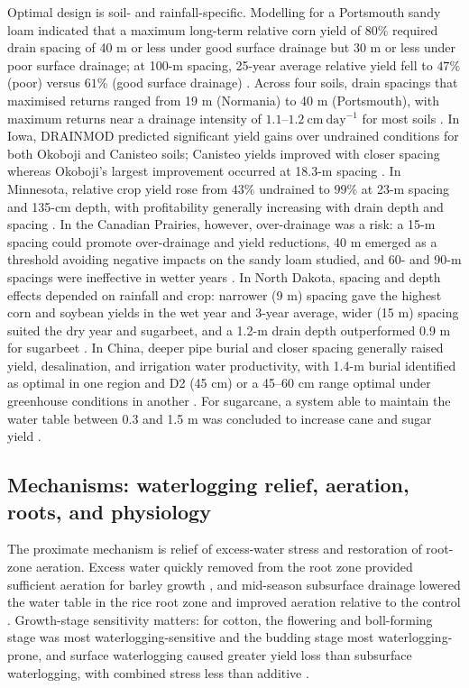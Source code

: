 \documentclass[11pt]{article}
\begin{document}
Optimal design is soil- and rainfall-specific. Modelling for a Portsmouth sandy loam indicated that a maximum long-term relative corn yield of \(80\%\) required drain spacing of 40 m or less under good surface drainage but 30 m or less under poor surface drainage; at 100-m spacing, 25-year average relative yield fell to \(47\%\) (poor) versus \(61\%\) (good surface drainage) \parencite{HARDJOAMIDJOJO1982}. Across four soils, drain spacings that maximised returns ranged from 19 m (Normania) to 40 m (Portsmouth), with maximum returns near a drainage intensity of \(1.1\textrm{--}1.2\ \mathrm{cm\ day^{-1}}\) for most soils \parencite{Skaggs2006}. In Iowa, DRAINMOD predicted significant yield gains over undrained conditions for both Okoboji and Canisteo soils; Canisteo yields improved with closer spacing whereas Okoboji's largest improvement occurred at 18.3-m spacing \parencite{Arora2024}. In Minnesota, relative crop yield rose from \(43\%\) undrained to \(99\%\) at 23-m spacing and 135-cm depth, with profitability generally increasing with drain depth and spacing \parencite{Sands2015}. In the Canadian Prairies, however, over-drainage was a risk: a 15-m spacing could promote over-drainage and yield reductions, 40 m emerged as a threshold avoiding negative impacts on the sandy loam studied, and 60- and 90-m spacings were ineffective in wetter years \parencite{Cordeiro2015}. In North Dakota, spacing and depth effects depended on rainfall and crop: narrower (9 m) spacing gave the highest corn and soybean yields in the wet year and 3-year average, wider (15 m) spacing suited the dry year and sugarbeet, and a 1.2-m drain depth outperformed 0.9 m for sugarbeet \parencite{Acharya2019}. In China, deeper pipe burial and closer spacing generally raised yield, desalination, and irrigation water productivity, with 1.4-m burial identified as optimal in one region and D2 (45 cm) or a 45--60 cm range optimal under greenhouse conditions in another \parencite{Liu2025,Yang2022,Guo2025,Hou2018}. For sugarcane, a system able to maintain the water table between 0.3 and 1.5 m was concluded to increase cane and sugar yield \parencite{CAMP1982}.

\subsection{Mechanisms: waterlogging relief, aeration, roots, and physiology}

The proximate mechanism is relief of excess-water stress and restoration of root-zone aeration. Excess water quickly removed from the root zone provided sufficient aeration for barley growth \parencite{BENNETT1982}, and mid-season subsurface drainage lowered the water table in the rice root zone and improved aeration relative to the control \parencite{DarziNaftchali2014}. Growth-stage sensitivity matters: for cotton, the flowering and boll-forming stage was most waterlogging-sensitive and the budding stage most waterlogging-prone, and surface waterlogging caused greater yield loss than subsurface waterlogging, with combined stress less than additive \parencite{Qian2021}.
\end{document}
